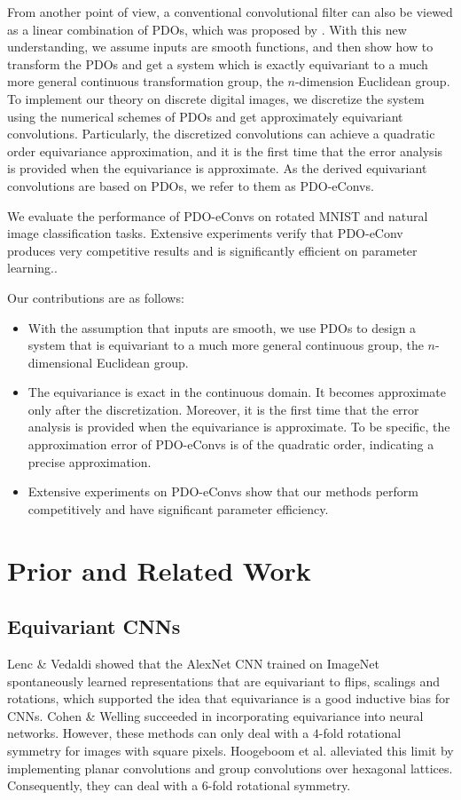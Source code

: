 \documentclass{article}
\begin{document}
From another point of view, a conventional convolutional filter can also be viewed as a linear combination of PDOs, which was proposed by \cite{ruthotto2018deep}. With this new understanding, we assume inputs are smooth functions, and then show how to transform the PDOs and get a system which is exactly equivariant to a much more general continuous transformation group, the $n$-dimension Euclidean group. To implement our theory on discrete digital images, we discretize the system using the numerical schemes of PDOs and get approximately equivariant convolutions. Particularly, the discretized convolutions can achieve a quadratic order equivariance approximation, and it is the first time that the error analysis is provided when the equivariance is approximate. As the derived equivariant convolutions are based on PDOs, we refer to them as PDO-eConvs.

We evaluate the performance of PDO-eConvs on rotated MNIST and natural image classification tasks. Extensive experiments verify that PDO-eConv produces very competitive results and is significantly efficient on parameter learning.. 

Our contributions are as follows:

\begin{itemize}
	\item With the assumption that inputs are smooth, we use PDOs to design a system that is equivariant to a much more general continuous group, the $n$-dimensional Euclidean group.
	\item The equivariance is exact in the continuous domain. It becomes approximate only after the discretization. Moreover, it is the first time that the error analysis is provided when the equivariance is approximate. To be specific, the approximation error of PDO-eConvs is of the quadratic order, indicating a precise approximation.
	\item Extensive experiments on PDO-eConvs show that our methods perform competitively and have significant parameter efficiency. 
\end{itemize}

\section{Prior and Related Work}
\subsection{Equivariant CNNs}

Lenc \& Vedaldi  showed that the AlexNet CNN \cite{krizhevsky2012imagenet} trained on ImageNet spontaneously learned representations that are equivariant to flips, scalings and rotations, which supported the idea that equivariance is a good inductive bias for CNNs. Cohen \& Welling  succeeded in incorporating equivariance into neural networks. However, these methods can only deal with a $4$-fold rotational symmetry for images with square pixels. Hoogeboom et al.  alleviated this limit by implementing planar convolutions and group convolutions over hexagonal lattices. Consequently, they can deal with a $6$-fold rotational symmetry.
\end{document}
